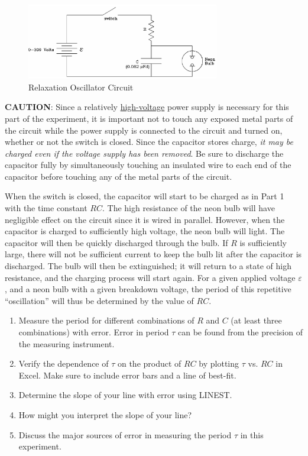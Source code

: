 \begin{figure}[h]
   \begin{center}
       \includegraphics[width=0.75\textwidth]{./Exp3/pic/image8.png}
   \end{center}
   \caption{Relaxation Oscillator Circuit}
   \label{fig:relaxcirc}
\end{figure}

\textbf{CAUTION}: Since a relatively \underline{high-voltage} power supply is necessary for this part of the experiment, it is important not to touch any exposed metal parts of the circuit while the power supply is connected to the circuit and turned on, whether or not the switch is closed. Since the capacitor stores charge, \emph{it may be charged even if the voltage supply has been removed}. Be sure to discharge the capacitor fully by simultaneously touching an insulated wire to each end of the capacitor before touching any of the metal parts of the circuit.\myskip

When the switch is closed, the capacitor will start to be charged as in Part 1 with the time constant $RC$. The high resistance  of the neon bulb will have negligible effect on the circuit since it is wired in parallel. However, when the capacitor is charged to sufficiently high voltage, the neon bulb will light. The capacitor will then be quickly discharged through the bulb. If $R$ is sufficiently large, there will not be sufficient current to keep the bulb lit after the capacitor is discharged. The bulb will then be extinguished; it will return to a state of high resistance, and the charging process will start again. For a given applied voltage $\varepsilon$, and a neon bulb with a given breakdown voltage, the period of this repetitive ``oscillation'' will thus be determined by the value of $RC$.\myskip
\begin{enumerate}
  \item Measure the period for different combinations of $R$ and $C$ (at least three combinations) with error. Error in period $\tau$ can be found from the precision of the measuring instrument.
  \item Verify the dependence of $\tau$ on the product of $RC$ by plotting $\tau$ vs. $RC$ in Excel. Make sure to include error bars and a line of best-fit.
  \item Determine the slope of your line with error using LINEST.
  \item How might you interpret the slope of your line?
  \item Discuss the major sources of error in measuring the period $\tau$ in this experiment.
\end{enumerate}
